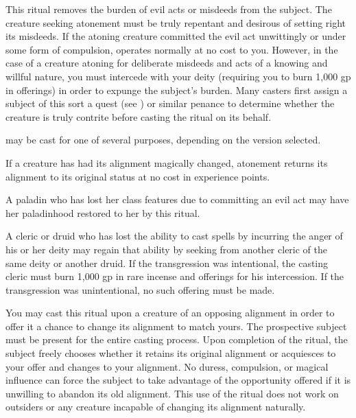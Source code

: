 \spelleffect 
{}
\spelleffect This ritual removes the burden of evil acts or misdeeds from the subject. The creature seeking atonement must be truly repentant and desirous of setting right its misdeeds. If the atoning creature committed the evil act unwittingly or under some form of compulsion,  operates normally at no cost to you. However, in the case of a creature atoning for deliberate misdeeds and acts of a knowing and willful nature, you must intercede with your deity (requiring you to burn 1,000 gp in offerings) in order to expunge the subject's burden. Many casters first assign a subject of this sort a quest (see ) or similar penance to determine whether the creature is truly contrite before casting the  ritual on its behalf.
\par {} may be cast for one of several purposes, depending on the version selected.
\par {} If a creature has had its alignment magically changed, atonement returns its alignment to its original status at no cost in experience points.
\par {} A paladin who has lost her class features due to committing an evil act may have her paladinhood restored to her by this ritual.
\par {} A cleric or druid who has lost the ability to cast spells by incurring the anger of his or her deity may regain that ability by seeking  from another cleric of the same deity or another druid. If the transgression was intentional, the casting cleric must burn 1,000 gp in rare incense and offerings for his intercession. If the transgression was unintentional, no such offering must be made.
\par {} You may cast this ritual upon a creature of an opposing alignment in order to offer it a chance to change its alignment to match yours. The prospective subject must be present for the entire casting process. Upon completion of the ritual, the subject freely chooses whether it retains its original alignment or acquiesces to your offer and changes to your alignment. No duress, compulsion, or magical influence can force the subject to take advantage of the opportunity offered if it is unwilling to abandon its old alignment. This use of the ritual does not work on outsiders or any creature incapable of changing its alignment naturally.
